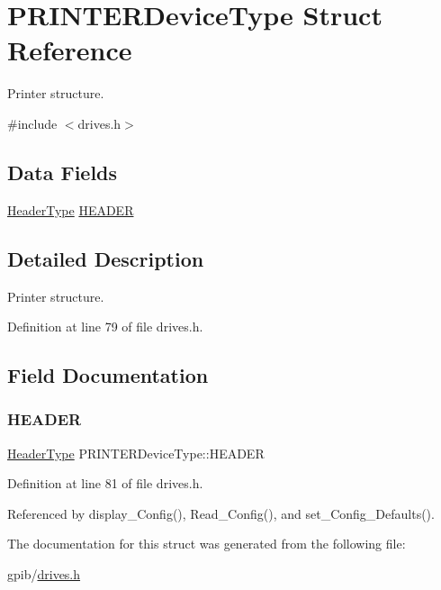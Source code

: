 \hypertarget{structPRINTERDeviceType}{}\section{P\+R\+I\+N\+T\+E\+R\+Device\+Type Struct Reference}
\label{structPRINTERDeviceType}


Printer structure.  




{\ttfamily \#include $<$drives.\+h$>$}

\subsection*{Data Fields}
\begin{DoxyCompactItemize}
\item 
\hyperlink{structHeaderType}{Header\+Type} \hyperlink{structPRINTERDeviceType_ac1ae5b29520f726e4aaab0232ecd6463}{H\+E\+A\+D\+ER}
\end{DoxyCompactItemize}


\subsection{Detailed Description}
Printer structure. 

Definition at line 79 of file drives.\+h.



\subsection{Field Documentation}
\mbox{\label{structPRINTERDeviceType_ac1ae5b29520f726e4aaab0232ecd6463}} 
\subsubsection{\texorpdfstring{H\+E\+A\+D\+ER}{HEADER}}
{\footnotesize\ttfamily \hyperlink{structHeaderType}{Header\+Type} P\+R\+I\+N\+T\+E\+R\+Device\+Type\+::\+H\+E\+A\+D\+ER}



Definition at line 81 of file drives.\+h.



Referenced by display\+\_\+\+Config(), Read\+\_\+\+Config(), and set\+\_\+\+Config\+\_\+\+Defaults().



The documentation for this struct was generated from the following file\+:\begin{DoxyCompactItemize}
\item 
gpib/\hyperlink{drives_8h}{drives.\+h}\end{DoxyCompactItemize}
